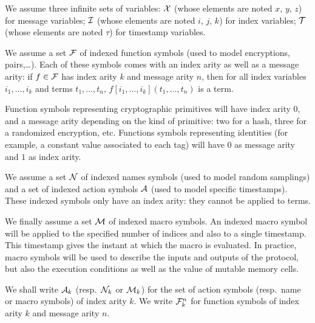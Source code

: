 \medskip

We assume three infinite sets of variables:
$\mathcal{X}$ (whose elements are noted $x$, $y$, $z$) for message variables;
$\mathcal{I}$ (whose elements are noted $i$, $j$, $k$) for index variables;
$\mathcal{T}$ (whose elements are noted $\tau$) for timestamp variables.

We assume a set $\mathcal{F}$ of indexed function symbols
(used to model encryptions, pairs,\dots).
Each of these symbols comes with an index arity as well as a message arity:
if $f\in\mathcal{F}$ has index arity $k$ and message arity $n$,
then for all index variables $i_1,\ldots,i_k$ and terms $t_1,\ldots,t_n$,
$f[i_1,\ldots,i_k](t_1,\ldots,t_n)$ is a term.

\begin{example}
  Function symbols representing cryptographic primitives will have index
  arity $0$, and a message arity depending on the kind of primitive:
  two for a hash, three for a randomized encryption, etc.
  Functions symbols representing identities (for example, a constant value
  associated to each tag) will have $0$ as message arity and $1$ as index arity.
\end{example}

We assume a set $\mathcal{N}$ of indexed names symbols
(used to model random samplings)
and a set of indexed action symbols $\mathcal{A}$
(used to model specific timestamps).
These indexed symbols only have an index arity: they
cannot be applied to terms.

We finally assume a set $\mathcal{M}$ of indexed macro symbols.
An indexed macro symbol will be applied to the specified number of
indices and also to a single timestamp.
This timestamp gives the instant at which the macro is evaluated.
In practice, macro symbols will be used to describe the inputs and outputs
of the protocol, but also the execution conditions as well as the value of
mutable memory cells.

We shall write $\mathcal{A}_k$ (resp.\ $\mathcal{N}_k$ or $\mathcal{M}_k$) for the set of action
symbols (resp.\ name or macro symbols) of index arity $k$.
We write $\mathcal{F}_k^n$ for function symbols of index arity $k$ and message
arity $n$.

